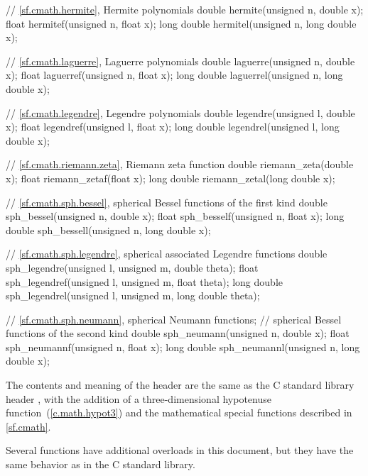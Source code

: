 \begin{codeblock}
{  // \ref{sf.cmath.hermite}, Hermite polynomials
  double       hermite(unsigned n, double x);
  float        hermitef(unsigned n, float x);
  long double  hermitel(unsigned n, long double x);

  // \ref{sf.cmath.laguerre}, Laguerre polynomials
  double       laguerre(unsigned n, double x);
  float        laguerref(unsigned n, float x);
  long double  laguerrel(unsigned n, long double x);

  // \ref{sf.cmath.legendre}, Legendre polynomials
  double       legendre(unsigned l, double x);
  float        legendref(unsigned l, float x);
  long double  legendrel(unsigned l, long double x);

  // \ref{sf.cmath.riemann.zeta}, Riemann zeta function
  double       riemann_zeta(double x);
  float        riemann_zetaf(float x);
  long double  riemann_zetal(long double x);

  // \ref{sf.cmath.sph.bessel}, spherical Bessel functions of the first kind
  double       sph_bessel(unsigned n, double x);
  float        sph_besself(unsigned n, float x);
  long double  sph_bessell(unsigned n, long double x);

  // \ref{sf.cmath.sph.legendre}, spherical associated Legendre functions
  double       sph_legendre(unsigned l, unsigned m, double theta);
  float        sph_legendref(unsigned l, unsigned m, float theta);
  long double  sph_legendrel(unsigned l, unsigned m, long double theta);

  // \ref{sf.cmath.sph.neumann}, spherical Neumann functions;
  // spherical Bessel functions of the second kind
  double       sph_neumann(unsigned n, double x);
  float        sph_neumannf(unsigned n, float x);
  long double  sph_neumannl(unsigned n, long double x);
}
\end{codeblock}

\pnum
The contents and meaning of the header 
are the same as the C standard library header ,
with the addition of
a three-dimensional hypotenuse function~(\ref{c.math.hypot3}) and
the mathematical special functions described in \ref{sf.cmath}.
\begin{note}
Several functions have additional overloads in this document,
but they have the same behavior as in the C standard library.
\end{note}

